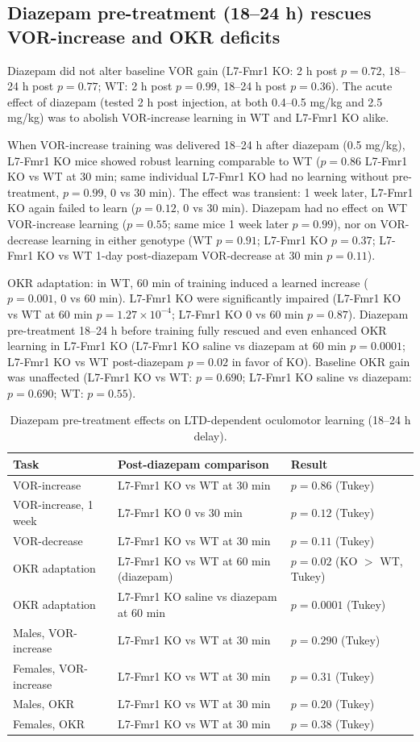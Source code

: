 \documentclass[11pt]{article}
\begin{document}
\subsection{Diazepam pre-treatment (18--24 h) rescues VOR-increase and OKR deficits}
Diazepam did not alter baseline VOR gain (L7-Fmr1 KO: 2 h post $p = 0.72$, 18--24 h post $p = 0.77$; WT: 2 h post $p = 0.99$, 18--24 h post $p = 0.36$). The acute effect of diazepam (tested 2 h post injection, at both 0.4--0.5 mg/kg and 2.5 mg/kg) was to abolish VOR-increase learning in WT and L7-Fmr1 KO alike.

When VOR-increase training was delivered 18--24 h after diazepam (0.5 mg/kg), L7-Fmr1 KO mice showed robust learning comparable to WT ($p = 0.86$ L7-Fmr1 KO vs WT at 30 min; same individual L7-Fmr1 KO had no learning without pre-treatment, $p = 0.99$, 0 vs 30 min). The effect was transient: 1 week later, L7-Fmr1 KO again failed to learn ($p = 0.12$, 0 vs 30 min). Diazepam had no effect on WT VOR-increase learning ($p = 0.55$; same mice 1 week later $p = 0.99$), nor on VOR-decrease learning in either genotype (WT $p = 0.91$; L7-Fmr1 KO $p = 0.37$; L7-Fmr1 KO vs WT 1-day post-diazepam VOR-decrease at 30 min $p = 0.11$).

OKR adaptation: in WT, 60 min of training induced a learned increase ($p = 0.001$, 0 vs 60 min). L7-Fmr1 KO were significantly impaired (L7-Fmr1 KO vs WT at 60 min $p = 1.27\times10^{-4}$; L7-Fmr1 KO 0 vs 60 min $p = 0.87$). Diazepam pre-treatment 18--24 h before training fully rescued and even enhanced OKR learning in L7-Fmr1 KO (L7-Fmr1 KO saline vs diazepam at 60 min $p = 0.0001$; L7-Fmr1 KO vs WT post-diazepam $p = 0.02$ in favor of KO). Baseline OKR gain was unaffected (L7-Fmr1 KO vs WT: $p = 0.690$; L7-Fmr1 KO saline vs diazepam: $p = 0.690$; WT: $p = 0.55$).

\begin{table}[h]
\centering
\caption{Diazepam pre-treatment effects on LTD-dependent oculomotor learning (18--24 h delay).}
\begin{tabular}{lll}
\toprule
Task & Post-diazepam comparison & Result \\
\midrule
VOR-increase & L7-Fmr1 KO vs WT at 30 min & $p = 0.86$ (Tukey) \\
VOR-increase, 1 week & L7-Fmr1 KO 0 vs 30 min & $p = 0.12$ (Tukey) \\
VOR-decrease & L7-Fmr1 KO vs WT at 30 min & $p = 0.11$ (Tukey) \\
OKR adaptation & L7-Fmr1 KO vs WT at 60 min (diazepam) & $p = 0.02$ (KO $>$ WT, Tukey) \\
OKR adaptation & L7-Fmr1 KO saline vs diazepam at 60 min & $p = 0.0001$ (Tukey) \\
Males, VOR-increase & L7-Fmr1 KO vs WT at 30 min & $p = 0.290$ (Tukey) \\
Females, VOR-increase & L7-Fmr1 KO vs WT at 30 min & $p = 0.31$ (Tukey) \\
Males, OKR & L7-Fmr1 KO vs WT at 30 min & $p = 0.20$ (Tukey) \\
Females, OKR & L7-Fmr1 KO vs WT at 30 min & $p = 0.38$ (Tukey) \\
\bottomrule
\end{tabular}
\end{table}
\end{document}
